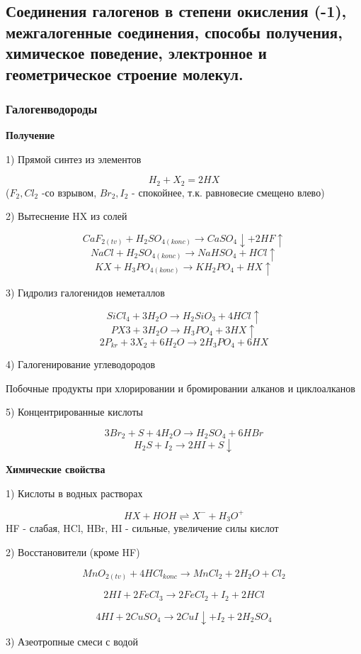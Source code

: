 

\subsection{Соединения галогенов в степени окисления (-1), межгалогенные соединения, способы получения, химическое поведение, электронное и геометрическое строение молекул.}

\subsubsection*{Галогенводороды}

\textbf{Получение}

1) Прямой синтез из элементов

$$H_2 + X_2 = 2HX$$
($F_2, Cl_2$ -со взрывом, $Br_2, I_2$ - спокойнее, т.к. равновесие смещено влево)

2) Вытеснение HX из солей

$$CaF_{2(tv)} + H_2SO_{4(konc)} \rightarrow CaSO_4\downarrow + 2HF\uparrow$$
$$NaCl + H_2SO_{4(konc)} \rightarrow NaHSO_4 + HCl\uparrow$$
$$KX + H_3PO_{4(konc)} \rightarrow KH_2PO_4 + HX\uparrow$$

3) Гидролиз галогенидов неметаллов

$$SiCl_4 + 3H_2O \rightarrow H_2SiO_3 + 4HCl \uparrow$$
$$PX3 + 3H_2O  \rightarrow H_3PO_4 + 3HX\uparrow$$
$$2P_{kr} + 3X_2 + 6H_2O \rightarrow 2H_3PO_4 + 6HX$$

4) Галогенирование углеводородов

Побочные продукты при хлорировании и бромировании алканов и циклоалканов

5) Концентрированные кислоты

$$3Br_2 + S + 4H_2O \rightarrow H_2SO_4 + 6HBr$$
$$H_2S + I_2 \rightarrow 2HI + S\downarrow$$

\textbf{Химические свойства}

1) Кислоты в водных растворах

$$HX + HOH \rightleftharpoons X^- + H_3O^+$$
HF - слабая, HCl, HBr, HI - сильные, увеличение силы кислот

2) Восстановители (кроме HF)

$$MnO_{2(tv)} + 4HCl_{konc} \rightarrow MnCl_2 + 2H_2O + Cl_2$$

$$2HI + 2FeCl_3 \rightarrow 2FeCl_2 + I_2 + 2HCl$$

$$4HI + 2CuSO_4 \rightarrow2CuI\downarrow + I_2 + 2H_2SO_4$$

3) Азеотропные смеси с водой
 
